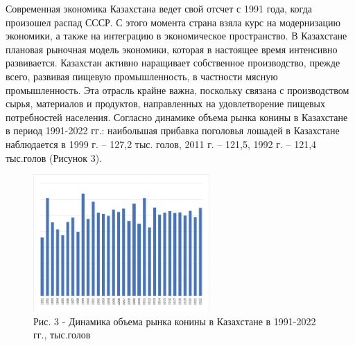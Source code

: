 \begin{multicols}{2}


Современная экономика Казахстана ведет свой отсчет с 1991 года, когда
произошел распад СССР. С этого момента страна взяла курс на модернизацию
экономики, а также на интеграцию в экономическое пространство. В
Казахстане плановая рыночная модель экономики, которая в настоящее время
интенсивно развивается. Казахстан активно наращивает собственное
производство, прежде всего, развивая пищевую промышленность, в частности
мясную промышленность. Эта отрасль крайне важна, поскольку связана с
производством сырья, материалов и продуктов, направленных на
удовлетворение пищевых потребностей населения. Согласно динамике объема
рынка конины в Казахстане в период 1991-2022 гг.: наибольшая прибавка
поголовья лошадей в Казахстане наблюдается в 1999 г. -- 127,2 тыс.
голов, 2011 г. -- 121,5, 1992 г. -- 121,4 тыс.голов (Рисунок 3).
\end{multicols}

\begin{figure}[H]
	\centering
	\includegraphics[width=0.6\textwidth]{assets/308}
	\caption*{Рис. 3 - Динамика объема рынка конины в Казахстане в 1991-2022 гг.,
	тыс.голов}
\end{figure}

